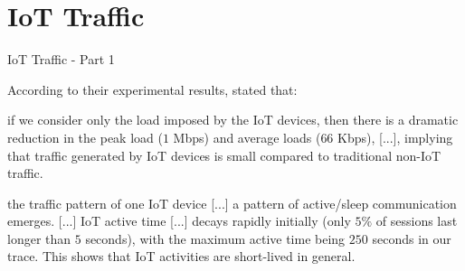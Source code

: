 \documentclass[10pt]{beamer}
\begin{document}
\section{IoT Traffic}
\begin{frame}{IoT Traffic - Part 1}

According to their experimental results, \citet{ITPAReport} stated that:

\begin{quoting}[font=itshape, begintext={``}, endtext={''\cite[par.~IV.A]{ITPAReport}}]
\justifying
[...] if we consider only the load imposed by the IoT devices, then there is a dramatic reduction in the peak load ($1$ Mbps) and average loads ($66$ Kbps), [...], implying that traffic generated by IoT devices is small compared to traditional non-IoT traffic. 
\end{quoting}

\begin{quoting}[font=itshape, begintext={``}, endtext={''\cite[par.~IV.A]{ITPAReport}}]
\justifying
the traffic pattern of one IoT device [...] a pattern of active/sleep communication emerges. [...] IoT active time [...] decays rapidly initially (only $5\%$ of sessions last longer than $5$ seconds), with the maximum active time being $250$ seconds in our trace. This shows that IoT activities are short-lived in general. 
\end{quoting}

\end{frame} 
\end{document}
